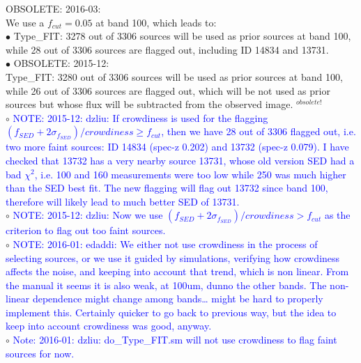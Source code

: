 \documentclass[11pt,a4paper]{article}
\begin{document}
\textcolor{black!30!white}{
OBSOLETE: 2016-03: \\
We use a $f_{cut} = 0.05$ at band 100, which leads to: \\
\indent\hspace{15pt}$\bullet$ 
Type\_FIT: 3278 out of 3306 sources will be used as prior sources at band 100, while 28 out of 3306 sources are flagged out, including ID 14834 and 13731. 
\\
\indent\hspace{15pt}$\bullet$ 
OBSOLETE: 2015-12: \\
\indent\hspace{20pt}
Type\_FIT: 3280 out of 3306 sources will be used as prior sources at band 100, while 26 out of 3306 sources are flagged out, which will be not used as prior sources but whose flux will be subtracted from the observed image. 
$^{obsolete!}$
}
\\
\indent\hspace{15pt}$\circ$ 
\textcolor{blue}{NOTE: 2015-12: dzliu: If crowdiness is used for the flagging $(f_{SED}+2\sigma_{f_{SED}})/crowdiness \ge f_{cut}$, then we have 28 out of 3306 flagged out, i.e. two more faint sources: ID 14834 (spec-z 0.202) and 13732 (spec-z 0.079). I have checked that 13732 has a very nearby source 13731, whose old version SED had a bad $\chi^2$, i.e. 100 and 160 measurements were too low while 250 was much higher than the SED best fit. The new flagging will flag out 13732 since band 100, therefore will likely lead to much better SED of 13731. }
\\
\indent\hspace{15pt}$\circ$ 
\textcolor{blue}{NOTE: 2015-12: dzliu: Now we use $(f_{SED}+2\sigma_{f_{SED}})/crowdiness > f_{cut}$ as the criterion to flag out too faint sources.}
\\
\indent\hspace{15pt}$\circ$ 
\textcolor{blue}{NOTE: 2016-01: edaddi: We either not use crowdiness in the process of selecting sources, or we use it guided by simulations, verifying how crowdiness affects the noise, and keeping into account that trend, which is non linear. From the manual it seems it is also weak, at 100um, dunno the other bands. The non-linear dependence might change among bands… might be hard to properly implement this. Certainly quicker to go back to previous way, but the idea to keep into account crowdiness was good, anyway.}
\\
\indent\hspace{15pt}$\circ$ 
\textcolor{blue}{Note: 2016-01: dzliu: do\_Type\_FIT.sm will not use crowdiness to flag faint sources for now.}
\\
\end{document}
